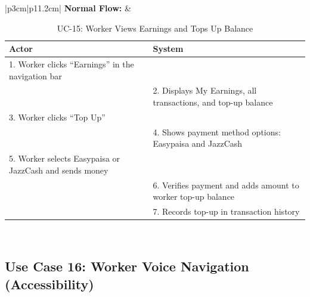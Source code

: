 {\small
\renewcommand{\arraystretch}{1.05}
\begin{table}[H]
\centering
\begin{tabular}{|p{3cm}|p{11.2cm}|}
\hline
\textbf{Normal Flow:} &
\begin{tabular}[t]{|p{5.4cm}|p{5.4cm}|}
\hline
\textbf{Actor} & \textbf{System} \\ \hline
1. Worker clicks ``Earnings'' in the navigation bar & \\ \hline
 & 2. Displays My Earnings, all transactions, and top-up balance \\ \hline
3. Worker clicks ``Top Up'' & \\ \hline
 & 4. Shows payment method options: Easypaisa and JazzCash \\ \hline
5. Worker selects Easypaisa or JazzCash and sends money & \\ \hline
 & 6. Verifies payment and adds amount to worker top-up balance \\ \hline
 & 7. Records top-up in transaction history \\ \hline
\end{tabular} \\ \hline
\end{tabular}
\caption{UC-15: Worker Views Earnings and Tops Up Balance}
\end{table}
}

\newpage

\subsection*{Use Case 16: Worker Voice Navigation (Accessibility)}

